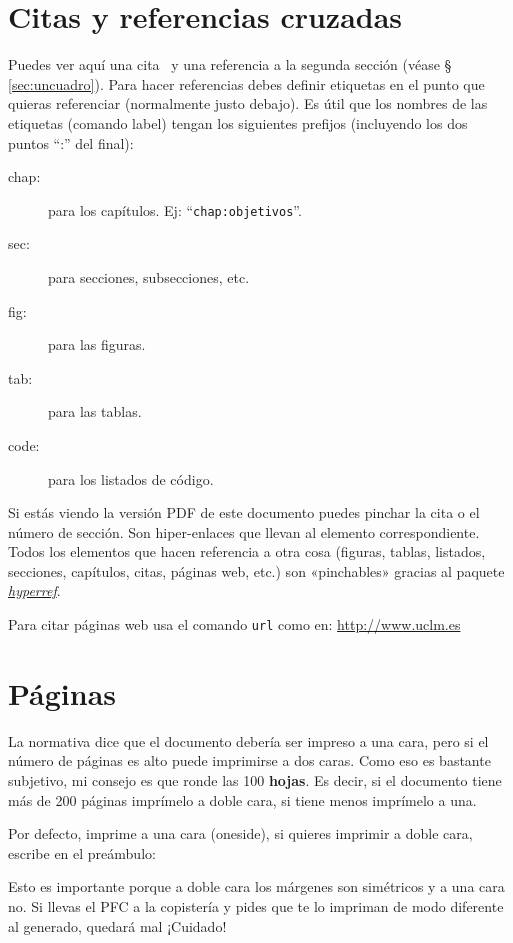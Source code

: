 \section{Citas y referencias cruzadas}

Puedes ver aquí una cita~\cite{design_patterns} y una referencia a la segunda sección
(véase \S\,\ref{sec:uncuadro}). Para hacer referencias debes definir etiquetas en el punto
que quieras referenciar (normalmente justo debajo). Es útil que los nombres de las
etiquetas (comando label) tengan los siguientes prefijos (incluyendo los dos puntos ``:''
del final):

\begin{description}
\item[chap:] para los capítulos. Ej: ``\texttt{chap:objetivos}''.
\item[sec:] para secciones, subsecciones, etc.
\item[fig:] para las figuras.
\item[tab:] para las tablas.
\item[code:] para los listados de código.
\end{description}

Si estás viendo la versión PDF de este documento puedes pinchar la cita o el número de
sección. Son hiper-enlaces que llevan al elemento correspondiente. Todos los elementos que
hacen referencia a otra cosa (figuras, tablas, listados, secciones, capítulos, citas,
páginas web, etc.) son «pinchables» gracias al paquete
\href{http://latex.tugraz.at/_media/docs/hyperref.pdf}{\emph{hyperref}}.

Para citar páginas web usa el comando \texttt{url} como en: \url{http://www.uclm.es}

\section{Páginas}
\label{sec:paginas}

La normativa dice que el documento debería ser impreso a una cara, pero si el
número de páginas es alto puede imprimirse a dos caras. Como eso es bastante
subjetivo, mi consejo es que ronde las 100 \textbf{hojas}. Es decir, si el
documento tiene más de 200 páginas imprímelo a doble cara, si tiene menos
imprímelo a una.

Por defecto, \arcopfc{} imprime a una cara (oneside), si quieres imprimir a doble cara,
escribe en el preámbulo:


Esto es importante porque a doble cara los márgenes son simétricos y a una cara
no. Si llevas el PFC a la copistería y pides que te lo impriman de modo
diferente al generado, quedará mal ¡Cuidado!
